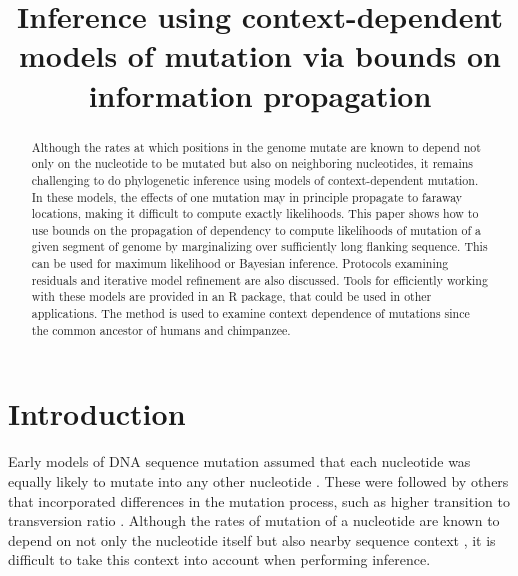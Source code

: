 \documentclass{article}
\theoremstyle{plain}
\theoremstyle{definition}
\begin{document}


%

\title{Inference using context-dependent models of mutation via bounds on information propagation}
\author{}

\maketitle

\begin{abstract}
    Although the rates at which positions in the genome mutate
    are known to depend not only on the nucleotide to be mutated
    but also on neighboring nucleotides,
    it remains challenging to do phylogenetic inference
    using models of context-dependent mutation.
    In these models,
    the effects of one mutation may in principle propagate
    to faraway locations,
    making it difficult to compute exactly likelihoods.
    This paper shows how to use bounds on the propagation of dependency
    to compute likelihoods of mutation of a given segment of genome
    by marginalizing over sufficiently long flanking sequence.
    This can be used for maximum likelihood or Bayesian inference.
    Protocols examining residuals and iterative model refinement
    are also discussed.
    Tools for efficiently working with these models
    are provided in an R package,
    that could be used in other applications.
    The method is used to examine context dependence of mutations
    since the common ancestor of humans and chimpanzee.
\end{abstract}

\section*{Introduction}

Early models of DNA sequence mutation
assumed that each nucleotide was equally likely to mutate
into any other nucleotide \citep{jukes1969evolution}.
These were followed by others that incorporated differences
in the mutation process, such as higher transition to transversion ratio
\citep{hasegawa1985dating,felsenstein1996hidden}.
Although the rates of mutation of a nucleotide
are known to depend on not only the nucleotide itself
but also nearby sequence context \citep{seplyarskiy2021population},
it is difficult to take this context into account when performing inference.
\end{document}
